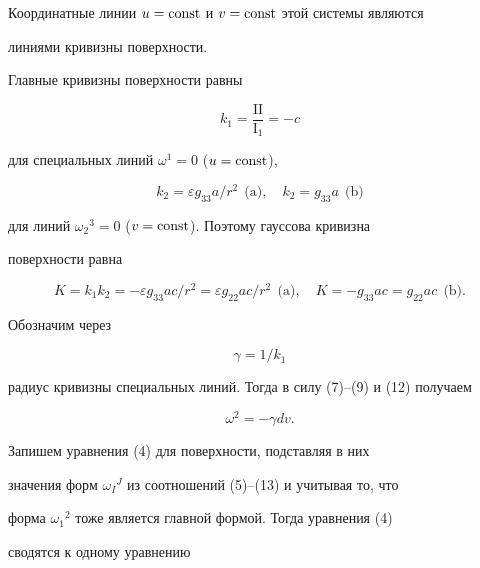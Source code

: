 Координатные линии $u=\operatorname{const}$ и $v=\operatorname{const}$ этой системы являются


линиями кривизны поверхности.





Главные кривизны поверхности равны


\begin{equation}


k_1=\frac{\mathrm{II}}{\mathrm I_1}=-c


\end{equation}


для специальных линий $\omega^1=0$ ($u=\operatorname{const}$),


$$


k_2=\varepsilon g_{33}a/r^2\ \ \text{(a)},\quad


k_2=g_{33}a \ \ \text{(b)}


$$


для линий $\omega_2{}^3=0$ ($v=\operatorname{const}$). Поэтому гауссова кривизна 


поверхности равна


\begin{equation}


K=k_1k_2=-\varepsilon g_{33}a c/r^2=


\varepsilon g_{22}a c/r^2\ \ \text{(a)},\quad


K=-g_{33}a c=g_{22}a c\ \ \text{(b)}.


\end{equation}


Обозначим через


\begin{equation}


\gamma=1/k_1


\end{equation}


радиус кривизны специальных линий. Тогда в силу (7)--(9) и (12) получаем


\begin{equation}


\omega^2=-\gamma d v.


\end{equation}


Запишем уравнения (4) для поверхности, подставляя в них


значения форм $\omega_I{}^J$ из соотношений (5)--(13) и учитывая то, что


форма $\omega_1{}^2$ тоже является главной формой. Тогда уравнения (4)


сводятся к одному уравнению


